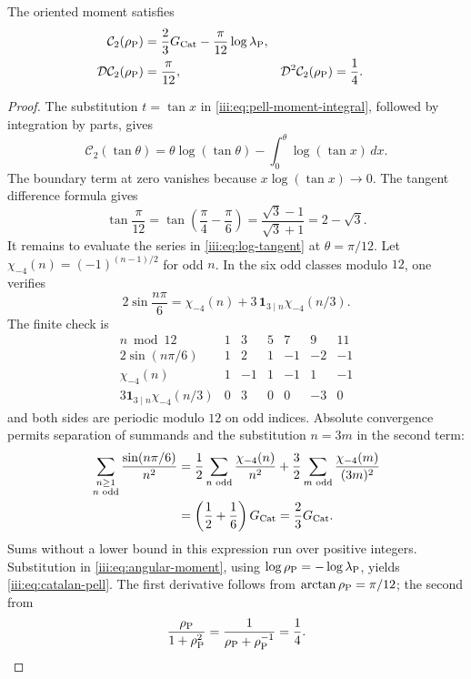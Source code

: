 \begin{theorem}
\label{iii:thm:catalan-pell}
The oriented moment satisfies
\begin{align}
 \mathcal C_2(\rho_{\rm P})
 &=\frac23G_{\rm Cat}-\frac{\pi}{12}\log\lambda_{\rm P},
 \label{iii:eq:catalan-pell}\\
 \mathcal D\mathcal C_2(\rho_{\rm P})&=\frac{\pi}{12},&
 \mathcal D^2\mathcal C_2(\rho_{\rm P})&=\frac14.
 \label{iii:eq:catalan-pell-derivatives}
\end{align}
\end{theorem}
\begin{proof}
The substitution $t=\tan x$ in \eqref{iii:eq:pell-moment-integral},
followed by integration by parts, gives
\begin{equation}
 \mathcal C_2(\tan\theta)
 =\theta\log(\tan\theta)
   -\int_0^\theta\log(\tan x)\,dx.
 \label{iii:eq:angular-moment}
\end{equation}
The boundary term at zero vanishes because $x\log(\tan x)\to0$.
The tangent difference formula gives
\[
 \tan\frac{\pi}{12}
 =\tan\left(\frac\pi4-\frac\pi6\right)
 =\frac{\sqrt3-1}{\sqrt3+1}=2-\sqrt3.
\]
It remains to evaluate the series in \eqref{iii:eq:log-tangent} at
$\theta=\pi/12$. Let $\chi_{-4}(n)=(-1)^{(n-1)/2}$ for odd $n$.
In the six odd classes modulo $12$, one verifies
\begin{equation}
 2\sin\frac{n\pi}{6}
 =\chi_{-4}(n)+3\,\mathbf1_{3\mid n}\chi_{-4}(n/3).
 \label{iii:eq:character-pell}
\end{equation}
The finite check is
\[
\begin{array}{c|rrrrrr}
 n\bmod12&1&3&5&7&9&11\\ \hline
 2\sin(n\pi/6)&1&2&1&-1&-2&-1\\
 \chi_{-4}(n)&1&-1&1&-1&1&-1\\
 3\mathbf1_{3\mid n}\chi_{-4}(n/3)&0&3&0&0&-3&0
\end{array}
\]
and both sides are periodic modulo $12$ on odd indices.
Absolute convergence permits separation of summands and the substitution $n=3m$
in the second term:
\begin{align*}
 \sum_{\substack{n\geq1\\n\text{ odd}}}
       \frac{\sin(n\pi/6)}{n^2}
 &=\frac12\sum_{n\text{ odd}}\frac{\chi_{-4}(n)}{n^2}
  +\frac32\sum_{m\text{ odd}}\frac{\chi_{-4}(m)}{(3m)^2}\\
 &=\left(\frac12+\frac16\right)G_{\rm Cat}
 =\frac23G_{\rm Cat}.
\end{align*}
Sums without a lower bound in this expression run over positive
integers. Substitution in \eqref{iii:eq:angular-moment}, using
$\log\rho_{\rm P}=-\log\lambda_{\rm P}$, yields
\eqref{iii:eq:catalan-pell}. The first derivative follows from
$\arctan\rho_{\rm P}=\pi/12$; the second from
\[
 \frac{\rho_{\rm P}}{1+\rho_{\rm P}^2}
 =\frac1{\rho_{\rm P}+\rho_{\rm P}^{-1}}=\frac14.
\]
\end{proof}

